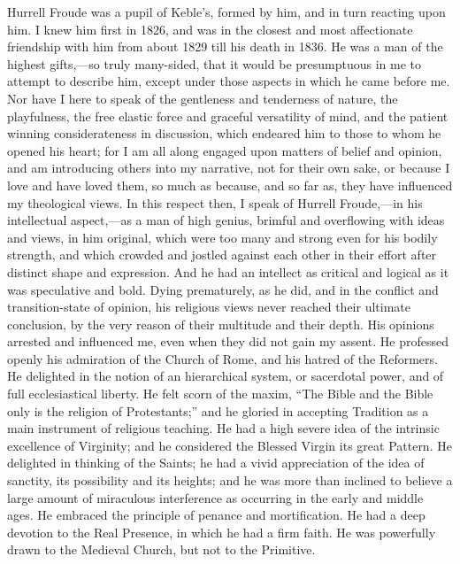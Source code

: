 Hurrell Froude was a pupil of Keble's, formed by him, and in turn
reacting upon him. I knew him first in 1826, and was in the closest
and most affectionate friendship with him from about 1829 till his
death in 1836. He was a man of the highest gifts,—so truly
many-sided, that it would be presumptuous in me to attempt to describe
him, except under those aspects in which he came before me. Nor
have I here to speak of the gentleness and tenderness of nature, the
playfulness, the free elastic force and graceful versatility of mind,
and the patient winning considerateness in discussion, which endeared
him to those to whom he opened his heart; for I am all along engaged
upon matters of belief and opinion, and am introducing others into my
narrative, not for their own sake, or because I love and have loved
them, so much as because, and so far as, they have influenced my
theological views. In this respect then, I speak of Hurrell Froude,—in
his intellectual aspect,—as a man of high genius, brimful and
overflowing with ideas and views, in him original, which were too many
and strong even for his bodily strength, and which crowded and jostled
against each other in their effort after distinct shape and
expression. And he had an intellect as critical and logical as it was
speculative and bold. Dying prematurely, as he did, and in the
conflict and transition-state of opinion, his religious views never
reached their ultimate conclusion, by the very reason of their
multitude and their depth. His opinions arrested and influenced me,
even when they did not gain my assent. He professed openly his
admiration of the Church of Rome, and his hatred of the Reformers. He
delighted in the notion of an hierarchical system, or sacerdotal power,
and of full ecclesiastical liberty. He felt scorn of the maxim,
``The Bible and the Bible only is the religion of
Protestants;'' and he gloried in accepting Tradition as a main
instrument of religious teaching. He had a high severe idea of the
intrinsic excellence of Virginity; and he considered the Blessed
Virgin its great Pattern. He delighted in thinking of the Saints; he
had a vivid
appreciation of the idea of sanctity, its possibility and its heights;
and he was more than inclined to believe a large amount of miraculous
interference as occurring in the early and middle ages. He embraced
the principle of penance and mortification. He had a deep devotion to
the Real Presence, in which he had a firm faith. He was powerfully
drawn to the Medieval Church, but not to the Primitive.

